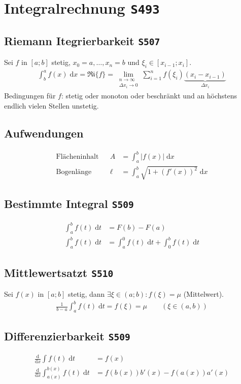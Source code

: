\documentclass[a4paper, twocolumn]{article}
\newcommand{\dd}[1]{\ensuremath{\mathrm{d}#1}}
\newcommand{\df}[2]{\ensuremath{\frac{\dd{#1}}{\dd{#2}}}}
\newcommand{\brpage}[1]{\textcolor{red!70!black}{\small\texttt{S#1}}}
\begin{document}
{\section{Integralrechnung \brpage{493}}
\subsection{Riemann Itegrierbarkeit \brpage{507}}
Sei \(f \text{ in } [a;b]\) stetig, \(x_0 = a, \dots, x_n = b\) und \(\xi_i \in [x_{i-1};x_{i}]\).
\begin{align*}
  \int_b^a f(x) \;\dd{x} = \mathfrak{Ri}\{f\}
  = \lim_{\substack{n\to\infty\\ \Delta x_i\to0 }}
  \sum_{i=1}^n f(\xi_i) \underbrace{(x_i - x_{i-1})}_{\Delta x_i}
\end{align*}
Bedingungen f\"ur \(f\): stetig oder monoton oder beschr\"ankt und an h\"ochstens endlich vielen Stellen unstetig.

\subsection{Aufwendungen}
\begin{align*}
  \text{Fl\"acheninhalt} && A &= \int_a^b |f(x)| \;\dd{x} \\
  \text{Bogenl\"ange} && \ell &= \int_a^b \sqrt{1 + (f'(x))^2} \;\dd{x}
\end{align*}

\subsection{Bestimmte Integral \brpage{509}}
\begin{align*}
  \int_a^b f(t)\;\dd{t} &= F(b) - F(a) \\
  \int_a^b f(t)\;\dd{t} &= \int_a^0 f(t)\;\dd{t} + \int_0^b f(t)\;\dd{t}
\end{align*}

\subsection{Mittlewertsatzt \brpage{510}}
Sei \(f(x)\) in \([a;b]\) stetig, dann \(\exists \xi \in (a;b) : f(\xi) = \mu\) (Mittelwert).
\begin{align*}
  \frac{1}{b-a}\int_a^b f(t) \;\dd{t} = f(\xi) = \mu \qquad (\xi\in (a,b))
\end{align*}

\subsection{Differenzierbarkeit \brpage{509}}
\begin{align*}
  \df{}{x} \int f(t) \;\dd{t} &= f(x) \\
  \df{}{x} \int_{a(x)}^{b(x)} f(t) \;\dd{t} &= f(b(x)) b'(x) - f(a(x))a'(x)
\end{align*}

}
\end{document}
